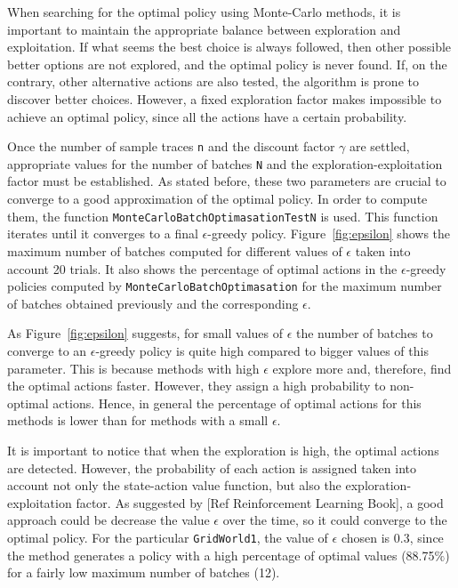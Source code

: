 \documentclass[11pt]{article}   	%
\begin{document}
When searching for the optimal policy using Monte-Carlo methods, it is important to maintain the appropriate balance between exploration and exploitation. If what seems the best choice is always followed, then other possible better options are not explored, and the optimal policy is never found. If, on the contrary, other alternative actions are also tested, the algorithm is prone to discover better choices. However, a  fixed exploration factor makes impossible to achieve an optimal policy, since all the actions have a certain probability.

Once the number of sample traces \texttt{n} and the discount factor $\gamma$ are settled, appropriate values for the number of batches \texttt{N} and the exploration-exploitation factor must be established. As stated before, these two parameters are crucial to converge to a good approximation of the optimal policy. In order to compute them, the function \texttt{MonteCarloBatchOptimasationTestN} is used. This function iterates until it converges to a final $\epsilon$-greedy policy. Figure~\ref{fig:epsilon} shows the maximum number of batches computed for different values of $\epsilon$ taken into account 20 trials. It also shows the percentage of optimal actions in the $\epsilon$-greedy policies computed by \texttt{MonteCarloBatchOptimasation} for the maximum number of batches obtained previously and the corresponding $\epsilon$.

As Figure~\ref{fig:epsilon} suggests, for small values of $\epsilon$ the number of batches to converge to an $\epsilon$-greedy policy is quite high compared to bigger values of this parameter. This is because methods with high $\epsilon$ explore more and, therefore, find the optimal actions faster. However, they assign a high probability to non-optimal actions. Hence, in general the percentage of optimal actions for this methods is lower than for methods with a small $\epsilon$.

It is important to notice that when the exploration is high, the optimal actions are detected. However, the probability of each action is assigned taken into account not only the state-action value function, but also the exploration-exploitation factor. As suggested by [Ref Reinforcement Learning Book], a good approach could be decrease the value $\epsilon$ over the time, so it could converge to the optimal policy. For the particular \texttt{GridWorld1}, the value of $\epsilon$ chosen is 0.3, since the method generates a policy with a high percentage of optimal values (88.75$\%$) for a fairly low maximum number of batches (12).
\end{document}
